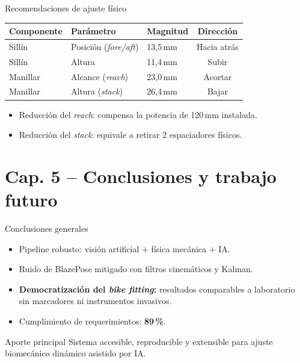 \documentclass[10pt, aspectratio=169]{beamer}
\begin{document}
\begin{frame}{Recomendaciones de ajuste físico}
    \begin{center}
        \small
        \begin{tabular}{@{}lllc@{}}
            \toprule
            \rowcolor{fiubablue!20}
            \textbf{Componente} & \textbf{Parámetro} & \textbf{Magnitud} & \textbf{Dirección} \\
            \midrule
            Sillín   & Posición (\textit{fore/aft}) & 13,5\,mm & Hacia atrás \\
            Sillín   & Altura                        & 11,4\,mm & Subir       \\
            Manillar & Alcance (\textit{reach})       & 23,0\,mm & Acortar     \\
            Manillar & Altura (\textit{stack})        & 26,4\,mm & Bajar       \\
            \bottomrule
        \end{tabular}
    \end{center}
    \vspace{6pt}
    \begin{itemize}
        \item Reducción del \textit{reach}: compensa la potencia de 120\,mm instalada.
        \item Reducción del \textit{stack}: equivale a retirar 2 espaciadores físicos.
    \end{itemize}
\end{frame}

\section{Cap. 5 -- Conclusiones y trabajo futuro}

\begin{frame}{Conclusiones generales}
    \begin{itemize}
        \item Pipeline robusto: visión artificial + física mecánica + IA.
        \item Ruido de BlazePose mitigado con filtros cinemáticos y Kalman.
        \item \textbf{Democratización del \textit{bike fitting}:} resultados
              comparables a laboratorio sin marcadores ni instrumentos invasivos.
        \item Cumplimiento de requerimientos: \textbf{89\,\%}.
    \end{itemize}
    \vspace{4pt}
    \begin{block}{Aporte principal}
        Sistema accesible, reproducible y extensible para ajuste biomecánico
        dinámico asistido por IA.
    \end{block}
\end{frame}
\end{document}

